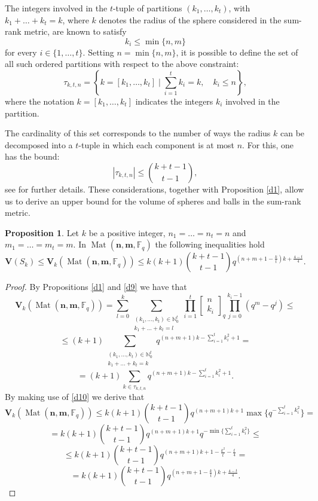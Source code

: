 \documentclass[11pt]{amsart}
\newcommand{\qqbin}[2]{\begin{bmatrix}
		{#1} \\ {#2 }
\end{bmatrix}_q}
\DeclareMathOperator{\Mat}{Mat}
\theoremstyle{definition}
\newtheorem{proposition}[theorem]{Proposition}
\newcommand{\F}{{\mathbb F}}
\newcommand{\bfn}{\mathbf {n}}
\newcommand{\bfm}{\mathbf {m}}
\newcommand{\spacmn}{\Mat(\bfn,\bfm,\F_q)}
\begin{document}
The integers involved in the $ t $-tuple of partitions $(k_1, \ldots, k_t)$, with $ k_1 + \ldots + k_t = k $, where $ k $ denotes the radius of the sphere considered in the sum-rank metric, are known to satisfy
\[
k_i \leq \min\{n, m\}
\]
for every $ i \in \{1, \ldots, t\} $. Setting $ n = \min\{n, m\} $, it is possible to define the set of all such ordered partitions with respect to the above constraint:
\[
\tau_{k, t, n} = \left\{ k = [k_1, \ldots, k_t] \mid \sum_{i=1}^t k_i = k, \quad k_i \leq n \right\},
\]
where the notation $ k = [k_1, \ldots, k_t] $ indicates the integers $ k_i $ involved in the partition.

The cardinality of this set corresponds to the number of ways the radius $ k $ can be decomposed into a $ t $-tuple in which each component is at most $ n $. For this, one has the bound:
\begin{equation} \label{d10}
	|\tau_{k, t, n}| \leq \binom{k + t - 1}{t - 1},
\end{equation}
see \cite{ratsaby2008estimate} for further details. These considerations, together with Proposition \ref{d1}, allow us to derive an upper bound for the volume of spheres and balls in the sum-rank metric.

\begin{proposition} \label{d12}
Let $ k $ be a positive integer,  $ n_1 = \ldots = n_t = n $ and $ m_1 = \ldots = m_t = m $. In $\spacmn$ the following inequalities hold
\[
\mathbf{V}(S_k) \leq \mathbf{V}_k(\spacmn) \leq k(k+1) \binom{k+t-1}{t-1} q^{(n + m + 1 - \frac{k}{t})k + \frac{4 - t}{4}}.
\]
\end{proposition}
\begin{proof}
	By Propositions \ref{d1} and \ref{d9} we have that 
    $$ \mathbf{V}_k(\spacmn)= \sum_{l=0}^{k} \sum_{\substack{(k_1,\ldots,k_t) \in \mathbb{N}_0^t \\ k_1+\ldots+k_t=l}} \prod_{i=1}^{t} \qqbin{n}{k_i} \prod_{j=0}^{k_i-1}(q^{m}-q^j) \leq $$ $$$$ $$ \leq (k+1) \sum_{\substack{(k_1,\ldots,k_t) \in \mathbb{N}_0^t \\ k_1+\ldots+k_t=k}} q^{(n+m+1)k-\sum_{i=1}^{t} k_i^2+1} = $$ $$$$ $$ = (k+1)  \sum_{k \in \tau_{k,t,n}} q^{(n+m+1)k-\sum_{i=1}^{t} k_i^2+1}.$$ 
    By making use of \eqref{d10} we derive that
    $$ \mathbf{V}_k(\spacmn)\leq  k(k+1) \binom{k+t-1}{t-1} q^{(n+m+1)k+1} \max\{ q^{-\sum_{i=1}^{t} k_i^2}\} = $$ $$$$ $$=k(k+1) \binom{k+t-1}{t-1} q^{(n+m+1)k+1}  q^{-\min \{\sum_{i=1}^{t} k_i^2\}} \leq $$ $$$$ $$ \leq k(k+1) \binom{k+t-1}{t-1} q^{(n+m+1)k+1 -\frac{k^2}{t}-\frac{t}{4}} = $$ $$$$ $$= k(k+1) \binom{k+t-1}{t-1} q^{(n+m+1-\frac{k}{t})k+\frac{4-t}{4}}. $$	
\end{proof}
\end{document}
